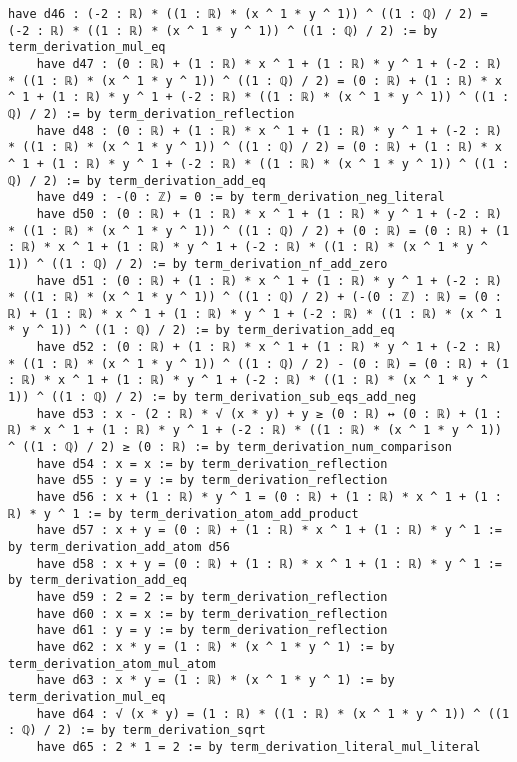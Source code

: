 \documentclass{article}
\begin{document}
\begin{tcolorbox}[colback=white!10, width=\linewidth]
\begin{lstlisting}[language=Lean4]
    have d46 : (-2 : ℝ) * ((1 : ℝ) * (x ^ 1 * y ^ 1)) ^ ((1 : ℚ) / 2) = (-2 : ℝ) * ((1 : ℝ) * (x ^ 1 * y ^ 1)) ^ ((1 : ℚ) / 2) := by term_derivation_mul_eq
    have d47 : (0 : ℝ) + (1 : ℝ) * x ^ 1 + (1 : ℝ) * y ^ 1 + (-2 : ℝ) * ((1 : ℝ) * (x ^ 1 * y ^ 1)) ^ ((1 : ℚ) / 2) = (0 : ℝ) + (1 : ℝ) * x ^ 1 + (1 : ℝ) * y ^ 1 + (-2 : ℝ) * ((1 : ℝ) * (x ^ 1 * y ^ 1)) ^ ((1 : ℚ) / 2) := by term_derivation_reflection
    have d48 : (0 : ℝ) + (1 : ℝ) * x ^ 1 + (1 : ℝ) * y ^ 1 + (-2 : ℝ) * ((1 : ℝ) * (x ^ 1 * y ^ 1)) ^ ((1 : ℚ) / 2) = (0 : ℝ) + (1 : ℝ) * x ^ 1 + (1 : ℝ) * y ^ 1 + (-2 : ℝ) * ((1 : ℝ) * (x ^ 1 * y ^ 1)) ^ ((1 : ℚ) / 2) := by term_derivation_add_eq
    have d49 : -(0 : ℤ) = 0 := by term_derivation_neg_literal
    have d50 : (0 : ℝ) + (1 : ℝ) * x ^ 1 + (1 : ℝ) * y ^ 1 + (-2 : ℝ) * ((1 : ℝ) * (x ^ 1 * y ^ 1)) ^ ((1 : ℚ) / 2) + (0 : ℝ) = (0 : ℝ) + (1 : ℝ) * x ^ 1 + (1 : ℝ) * y ^ 1 + (-2 : ℝ) * ((1 : ℝ) * (x ^ 1 * y ^ 1)) ^ ((1 : ℚ) / 2) := by term_derivation_nf_add_zero
    have d51 : (0 : ℝ) + (1 : ℝ) * x ^ 1 + (1 : ℝ) * y ^ 1 + (-2 : ℝ) * ((1 : ℝ) * (x ^ 1 * y ^ 1)) ^ ((1 : ℚ) / 2) + (-(0 : ℤ) : ℝ) = (0 : ℝ) + (1 : ℝ) * x ^ 1 + (1 : ℝ) * y ^ 1 + (-2 : ℝ) * ((1 : ℝ) * (x ^ 1 * y ^ 1)) ^ ((1 : ℚ) / 2) := by term_derivation_add_eq
    have d52 : (0 : ℝ) + (1 : ℝ) * x ^ 1 + (1 : ℝ) * y ^ 1 + (-2 : ℝ) * ((1 : ℝ) * (x ^ 1 * y ^ 1)) ^ ((1 : ℚ) / 2) - (0 : ℝ) = (0 : ℝ) + (1 : ℝ) * x ^ 1 + (1 : ℝ) * y ^ 1 + (-2 : ℝ) * ((1 : ℝ) * (x ^ 1 * y ^ 1)) ^ ((1 : ℚ) / 2) := by term_derivation_sub_eqs_add_neg
    have d53 : x - (2 : ℝ) * √ (x * y) + y ≥ (0 : ℝ) ↔ (0 : ℝ) + (1 : ℝ) * x ^ 1 + (1 : ℝ) * y ^ 1 + (-2 : ℝ) * ((1 : ℝ) * (x ^ 1 * y ^ 1)) ^ ((1 : ℚ) / 2) ≥ (0 : ℝ) := by term_derivation_num_comparison
    have d54 : x = x := by term_derivation_reflection
    have d55 : y = y := by term_derivation_reflection
    have d56 : x + (1 : ℝ) * y ^ 1 = (0 : ℝ) + (1 : ℝ) * x ^ 1 + (1 : ℝ) * y ^ 1 := by term_derivation_atom_add_product
    have d57 : x + y = (0 : ℝ) + (1 : ℝ) * x ^ 1 + (1 : ℝ) * y ^ 1 := by term_derivation_add_atom d56
    have d58 : x + y = (0 : ℝ) + (1 : ℝ) * x ^ 1 + (1 : ℝ) * y ^ 1 := by term_derivation_add_eq
    have d59 : 2 = 2 := by term_derivation_reflection
    have d60 : x = x := by term_derivation_reflection
    have d61 : y = y := by term_derivation_reflection
    have d62 : x * y = (1 : ℝ) * (x ^ 1 * y ^ 1) := by term_derivation_atom_mul_atom
    have d63 : x * y = (1 : ℝ) * (x ^ 1 * y ^ 1) := by term_derivation_mul_eq
    have d64 : √ (x * y) = (1 : ℝ) * ((1 : ℝ) * (x ^ 1 * y ^ 1)) ^ ((1 : ℚ) / 2) := by term_derivation_sqrt
    have d65 : 2 * 1 = 2 := by term_derivation_literal_mul_literal

\end{lstlisting}
\end{tcolorbox}
\end{document}
